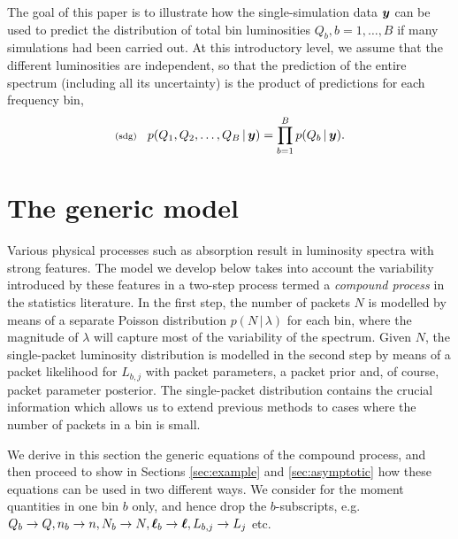 \documentclass[11pt]{article}
\newcommand{\fred}[1]{\todo[color=orange!40,inline]{#1}} %
\newcommand{\lleq}[1]{\label{#1} }
\renewcommand{\lleq}[1]{\label{#1} {\scriptstyle {\rm (#1)}} \hspace*{2ex} }
\newcommand{\cond}{\,|\,}
\newcommand{\Lum}{L}
\begin{document}
The goal of this paper is to illustrate how the single-simulation data
${\bm{y}}$ can be used to predict the distribution of total bin
luminosities $Q_b, b = 1,\ldots,B$ if many simulations had been
carried out. At this introductory level, we assume that the different
luminosities are independent, so that the prediction of the entire
spectrum (including all its uncertainty) is the product of predictions
for each frequency bin,
\begin{align}
  \lleq{sdg}
  p(Q_1,Q_2,\ldots,Q_B\cond\bmy) = \prod_{b=1}^B p(Q_b\cond \bmy).
\end{align}

\section{The generic model} \label{sec:model}

Various physical processes such as absorption result in luminosity
spectra with strong features. The model we develop below takes into
account the variability introduced by these features in a two-step
process termed a \textit{compound process} in the statistics
literature. 
% 
In the first step, the number of packets $N$ is modelled by means of a
separate Poisson distribution $p(N\cond\lambda)$ for each bin, where
the magnitude of $\lambda$ will capture most of the variability of the
spectrum. Given $N$, the single-packet luminosity distribution is
modelled in the second step by means of a packet likelihood for
$\Lum_{b,j}$ with packet parameters, a packet prior and, of course,
packet parameter posterior. The single-packet distribution contains
the crucial information which allows us to extend previous methods to
cases where the number of packets in a bin is small.
\fred{Refs: Zech, maybe others, too} 


We derive in this section the generic equations of the compound
process, and then proceed to show in Sections \ref{sec:example} and
\ref{sec:asymptotic} how these equations can be used in two different
ways.
% 
We consider for the moment quantities in one bin $b$ only, and hence
drop the $b$-subscripts, e.g.\
$Q_b \to Q, n_b \to n, N_b\to N, {\bm{\ell}}_b\to{\bm{\ell}}, L_{b,j} \to L_j$ etc.
\end{document}
